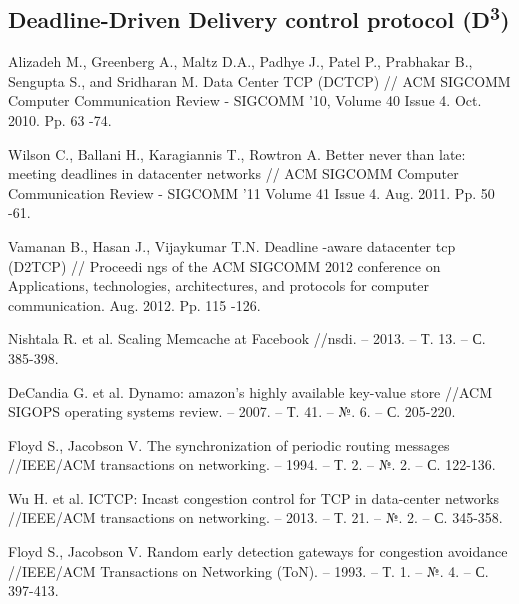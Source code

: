 \documentclass[14pt, a4paper,oneside]{extarticle}
\begin{document}

\subsection{Deadline-Driven Delivery control protocol (D\textsuperscript{3})}


\newpage




\begin{thebibliography}{9}

Alizadeh M., Greenberg A., Maltz
 D.A., Padhye J., Patel P., Prabhakar B., 
Sengupta S., and Sridharan M. Data Center TCP (DCTCP) // ACM SIGCOMM 
Computer Communication Review -
 SIGCOMM '10, Volume 40 Issue 4. Oct. 
2010. Pp. 63
-74.

Wilson C., Ballani H., Karagiannis T., Rowtron
 A. Better never than late: meeting 
deadlines in datacenter networks // ACM SIGCOMM Computer Communication 
Review 
- SIGCOMM '11 Volume 41 Issue 4. Aug. 2011. Pp. 50
-61. 

Vamanan B., Hasan J., Vijaykumar T.N. Deadline
-aware datacenter tcp (D2TCP) 
// Proceedi
ngs of the ACM SIGCOMM 2012 conference on Applications, 
technologies, architectures, and protocols for computer communication. Aug. 
2012. Pp. 115
-126. 

Nishtala R. et al. Scaling Memcache at Facebook //nsdi. – 2013. – Т. 13. – С. 385-398.

DeCandia G. et al. Dynamo: amazon's highly available key-value store //ACM SIGOPS operating systems review. – 2007. – Т. 41. – №. 6. – С. 205-220.

Floyd S., Jacobson V. The synchronization of periodic routing messages //IEEE/ACM transactions on networking. – 1994. – Т. 2. – №. 2. – С. 122-136.

Wu H. et al. ICTCP: Incast congestion control for TCP in data-center networks //IEEE/ACM transactions on networking. – 2013. – Т. 21. – №. 2. – С. 345-358.

Floyd S., Jacobson V. Random early detection gateways for congestion avoidance //IEEE/ACM Transactions on Networking (ToN). – 1993. – Т. 1. – №. 4. – С. 397-413.

\end{thebibliography}
\end{document}
